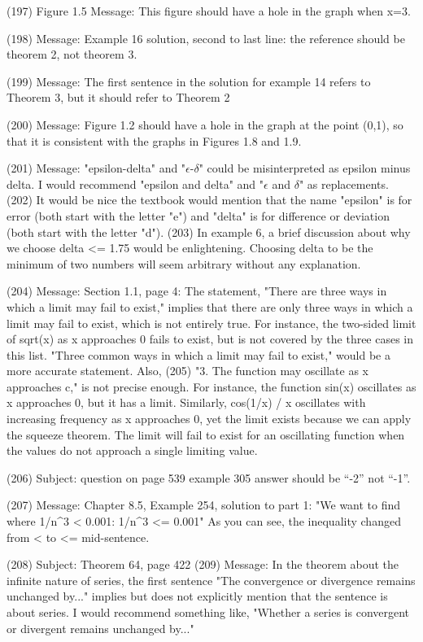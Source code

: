 {(197)  Figure 1.5   Message: This figure should have a hole in the graph when x=3.

(198)  Message: Example 16 solution, second to last line: the reference should be theorem 2, not theorem 3.

(199)  Message: The first sentence in the solution for example 14 refers to Theorem 3, but it should refer to Theorem 2

(200)  Message: Figure 1.2 should have a hole in the graph at the point (0,1), so that it is consistent with the graphs in Figures 1.8 and 1.9.

(201)  Message: "epsilon-delta" and "$\epsilon$-$\delta$" could be misinterpreted as epsilon minus delta. I would recommend "epsilon and delta" and "$\epsilon$ and $\delta$" as replacements.       
(202)  It would be nice the textbook would mention that the name "epsilon" is for error (both start with the letter "e") and "delta" is for difference or deviation (both start with the letter "d").       
(203)  In example 6, a brief discussion about why we choose delta <= 1.75 would be enlightening. Choosing delta to be the minimum of two numbers will seem arbitrary without any explanation.

(204)  Message: Section 1.1, page 4: The statement, "There are three ways in which a limit may fail to exist," implies that there are only three ways in which a limit may fail to exist, which is not entirely true. For instance, the two-sided limit of sqrt(x) as x approaches 0 fails to exist, but is not covered by the three cases in this list. "Three common ways in which a limit may fail to exist," would be a more accurate statement. Also,   
(205)  "3. The function may oscillate as x approaches c," is not precise enough. For instance, the function sin(x) oscillates as x approaches 0, but it has a limit. Similarly, cos(1/x) / x oscillates with increasing frequency as x approaches 0, yet the limit exists because we can apply the squeeze theorem. The limit will fail to exist for an oscillating function when the values do not approach a single limiting value.

(206)  Subject: question on page 539 example 305     answer should be ``-2'' not ``-1''.

(207)  Message: Chapter 8.5, Example 254, solution to part 1: "We want to find where 1/n^3 < 0.001: 1/n^3 <= 0.001" As you can see, the inequality changed from < to <= mid-sentence.

(208)  Subject: Theorem 64, page 422
(209)  Message: In the theorem about the infinite nature of series, the first sentence "The convergence or divergence remains unchanged by..." implies but does not explicitly mention that the sentence is about series. I would recommend something like, "Whether a series is convergent or divergent remains unchanged by..."

}
